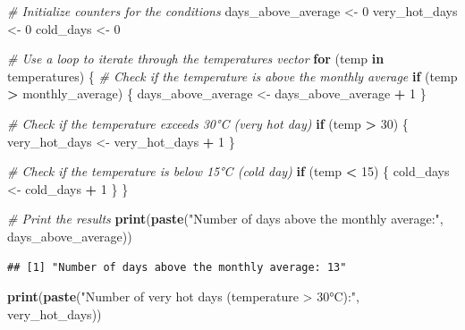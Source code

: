 \documentclass[
]{book}
\newenvironment{Shaded}{\begin{snugshade}}{\end{snugshade}}
\newcommand{\CommentTok}[1]{\textcolor[rgb]{0.56,0.35,0.01}{\textit{#1}}}
\newcommand{\ControlFlowTok}[1]{\textcolor[rgb]{0.13,0.29,0.53}{\textbf{#1}}}
\newcommand{\DecValTok}[1]{\textcolor[rgb]{0.00,0.00,0.81}{#1}}
\newcommand{\FunctionTok}[1]{\textcolor[rgb]{0.13,0.29,0.53}{\textbf{#1}}}
\newcommand{\NormalTok}[1]{#1}
\newcommand{\OtherTok}[1]{\textcolor[rgb]{0.56,0.35,0.01}{#1}}
\newcommand{\SpecialCharTok}[1]{\textcolor[rgb]{0.81,0.36,0.00}{\textbf{#1}}}
\newcommand{\StringTok}[1]{\textcolor[rgb]{0.31,0.60,0.02}{#1}}
\begin{document}
\begin{Shaded}
\begin{Highlighting}[]
\CommentTok{\# Initialize counters for the conditions}
\NormalTok{days\_above\_average }\OtherTok{\textless{}{-}} \DecValTok{0}
\NormalTok{very\_hot\_days }\OtherTok{\textless{}{-}} \DecValTok{0}
\NormalTok{cold\_days }\OtherTok{\textless{}{-}} \DecValTok{0}

\CommentTok{\# Use a loop to iterate through the temperatures vector}
\ControlFlowTok{for}\NormalTok{ (temp }\ControlFlowTok{in}\NormalTok{ temperatures) \{}
  \CommentTok{\# Check if the temperature is above the monthly average}
  \ControlFlowTok{if}\NormalTok{ (temp }\SpecialCharTok{\textgreater{}}\NormalTok{ monthly\_average) \{}
\NormalTok{    days\_above\_average }\OtherTok{\textless{}{-}}\NormalTok{ days\_above\_average }\SpecialCharTok{+} \DecValTok{1}
\NormalTok{  \}}
  
  \CommentTok{\# Check if the temperature exceeds 30°C (very hot day)}
  \ControlFlowTok{if}\NormalTok{ (temp }\SpecialCharTok{\textgreater{}} \DecValTok{30}\NormalTok{) \{}
\NormalTok{    very\_hot\_days }\OtherTok{\textless{}{-}}\NormalTok{ very\_hot\_days }\SpecialCharTok{+} \DecValTok{1}
\NormalTok{  \}}
  
  \CommentTok{\# Check if the temperature is below 15°C (cold day)}
  \ControlFlowTok{if}\NormalTok{ (temp }\SpecialCharTok{\textless{}} \DecValTok{15}\NormalTok{) \{}
\NormalTok{    cold\_days }\OtherTok{\textless{}{-}}\NormalTok{ cold\_days }\SpecialCharTok{+} \DecValTok{1}
\NormalTok{  \}}
\NormalTok{\}}

\CommentTok{\# Print the results}
\FunctionTok{print}\NormalTok{(}\FunctionTok{paste}\NormalTok{(}\StringTok{"Number of days above the monthly average:"}\NormalTok{, days\_above\_average))}
\end{Highlighting}
\end{Shaded}

\begin{verbatim}
## [1] "Number of days above the monthly average: 13"
\end{verbatim}

\begin{Shaded}
\begin{Highlighting}[]
\FunctionTok{print}\NormalTok{(}\FunctionTok{paste}\NormalTok{(}\StringTok{"Number of very hot days (temperature \textgreater{} 30°C):"}\NormalTok{, very\_hot\_days))}
\end{Highlighting}
\end{Shaded}
\end{document}
